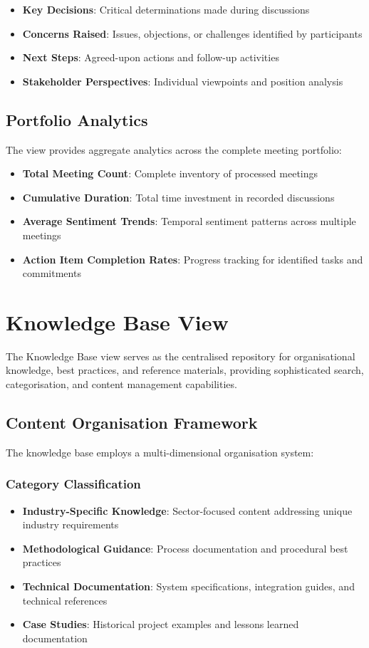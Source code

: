 \documentclass{article}
\begin{document}
\begin{itemize}
    \item \textbf{Key Decisions}: Critical determinations made during discussions
    \item \textbf{Concerns Raised}: Issues, objections, or challenges identified by participants
    \item \textbf{Next Steps}: Agreed-upon actions and follow-up activities
    \item \textbf{Stakeholder Perspectives}: Individual viewpoints and position analysis
\end{itemize}

\subsection{Portfolio Analytics}
The view provides aggregate analytics across the complete meeting portfolio:

\begin{itemize}
    \item \textbf{Total Meeting Count}: Complete inventory of processed meetings
    \item \textbf{Cumulative Duration}: Total time investment in recorded discussions
    \item \textbf{Average Sentiment Trends}: Temporal sentiment patterns across multiple meetings
    \item \textbf{Action Item Completion Rates}: Progress tracking for identified tasks and commitments
\end{itemize}

\section{Knowledge Base View}
The Knowledge Base view serves as the centralised repository for organisational knowledge, best practices, and reference materials, providing sophisticated search, categorisation, and content management capabilities.

\subsection{Content Organisation Framework}
The knowledge base employs a multi-dimensional organisation system:

\subsubsection{Category Classification}
\begin{itemize}
    \item \textbf{Industry-Specific Knowledge}: Sector-focused content addressing unique industry requirements
    \item \textbf{Methodological Guidance}: Process documentation and procedural best practices
    \item \textbf{Technical Documentation}: System specifications, integration guides, and technical references
    \item \textbf{Case Studies}: Historical project examples and lessons learned documentation
\end{itemize}
\end{document}
